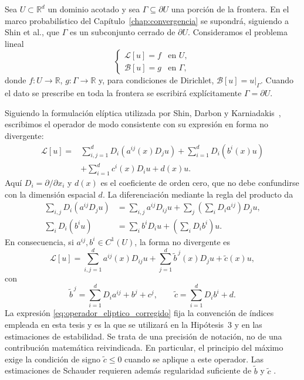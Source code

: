 Sea $U\subset\mathbb{R}^d$ un dominio acotado y sea $\Gamma\subseteq\partial U$ una porción de la frontera. En el marco probabilístico del Capítulo~\ref{chap:convergencia} se supondrá, siguiendo a Shin et al., que $\Gamma$ es un subconjunto cerrado de $\partial U$. Consideramos el problema lineal
\[
\begin{cases}
    \mathcal{L}[u] = f & \text{en } U, \\
    \mathcal{B}[u] = g & \text{en } \Gamma,
\end{cases}
\]
donde $f:U\to\mathbb{R}$, $g:\Gamma\to\mathbb{R}$ y, para condiciones de Dirichlet,
$\mathcal{B}[u]=u|_{\Gamma}$. Cuando el dato se prescribe en toda la frontera se escribirá explícitamente
$\Gamma=\partial U$.

Siguiendo la formulación elíptica utilizada por Shin, Darbon y
Karniadakis~\cite{shin2020convergence}, escribimos el operador de modo
consistente con su expresión en forma no divergente:
\begin{equation}\label{eq:operador_eliptico_corregido}
\begin{aligned}
\mathcal{L}[u]
={}&\sum_{i,j=1}^{d}D_i\!\left(a^{ij}(x)D_j u\right)
 +\sum_{i=1}^{d}D_i\!\left(b^i(x)u\right)\\
 &+\sum_{i=1}^{d}c^i(x)D_i u+d(x)u.
\end{aligned}
\end{equation}
Aquí $D_i=\partial/\partial x_i$ y $d(x)$ es el coeficiente de orden
cero, que no debe confundirse con la dimensión espacial $d$.
La diferenciación mediante la regla del producto da
\[
\begin{aligned}
\sum_{i,j}D_i(a^{ij}D_j u)
&=\sum_{i,j}a^{ij}D_{ij}u
 +\sum_j\!\left(\sum_i D_i a^{ij}\right)D_j u,\\
\sum_i D_i(b^i u)&=\sum_i b^iD_i u
 +\left(\sum_iD_i b^i\right)u.
\end{aligned}
\]
En consecuencia, si $a^{ij},b^i\in C^1(U)$, la forma no divergente es
\begin{equation}\label{eq:operador_eliptico_no_divergente}
\mathcal{L}[u]
=\sum_{i,j=1}^{d}a^{ij}(x)D_{ij}u
 +\sum_{j=1}^{d}\widetilde b^{\,j}(x)D_j u
 +\widetilde c(x)u,
\end{equation}
con
\[
\widetilde b^{\,j}=\sum_{i=1}^{d}D_i a^{ij}+b^j+c^j,
\qquad
\widetilde c=\sum_{i=1}^{d}D_i b^i+d.
\]
La expresión \eqref{eq:operador_eliptico_corregido} fija la convención
de índices empleada en esta tesis y es la que se utilizará en la
Hipótesis~3 y en las estimaciones de estabilidad. Se trata de una
precisión de notación, no de una contribución matemática reivindicada.
En particular, el principio del máximo exige la condición de signo
$\widetilde c\leq0$ cuando se aplique a este operador. Las estimaciones de
Schauder requieren además regularidad suficiente de $\widetilde b$ y
$\widetilde c$ \cite{gilbarg2001elliptic}.

